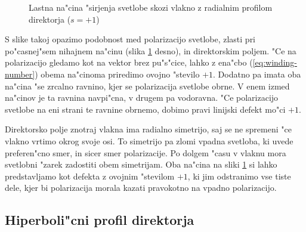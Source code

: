 \documentclass[a4paper,10pt]{article}
\begin{document}
\begin{figure}[!htbp]
 \centering
 \caption{Lastna na"cina "sirjenja svetlobe skozi vlakno z radialnim profilom direktorja ($s=+1$)}
 \label{fig:pulse-p1-mode}
\end{figure}

S slike takoj opazimo podobnost med polarizacijo svetlobe, zlasti pri po"casnej"sem nihajnem na"cinu (slika \ref{fig:pulse-p1-mode} desno), in direktorskim poljem. 
"Ce na polarizacijo gledamo kot na vektor brez pu"s"cice, lahko z ena"cbo (\ref{eq:winding-number}) obema na"cinoma priredimo ovojno "stevilo $+1$. 
Dodatno pa imata oba na"cina "se zrcalno ravnino, kjer se polarizacija svetlobe obrne. 
V enem izmed na"cinov je ta ravnina navpi"cna, v drugem pa vodoravna. 
"Ce polarizacijo svetlobe na eni strani te ravnine obrnemo, dobimo pravi linijski defekt mo"ci $+1$. 

Direktorsko polje znotraj vlakna ima radialno simetrijo, saj se ne spremeni "ce vlakno vrtimo okrog svoje osi. 
To simetrijo pa zlomi vpadna svetloba, ki uvede preferen"cno smer, in sicer smer polarizacije. 
Po dolgem "casu v vlaknu mora svetlobni "zarek zadostiti obem simetrijam. 
Oba na"cina na sliki \ref{fig:pulse-p1-mode} si lahko predstavljamo kot defekta z ovojnim "stevilom $+1$, ki jim odstranimo vse tiste dele, kjer bi polarizacija morala kazati pravokotno na vpadno polarizacijo. 

\subsection{Hiperboli"cni profil direktorja}
\end{document}
